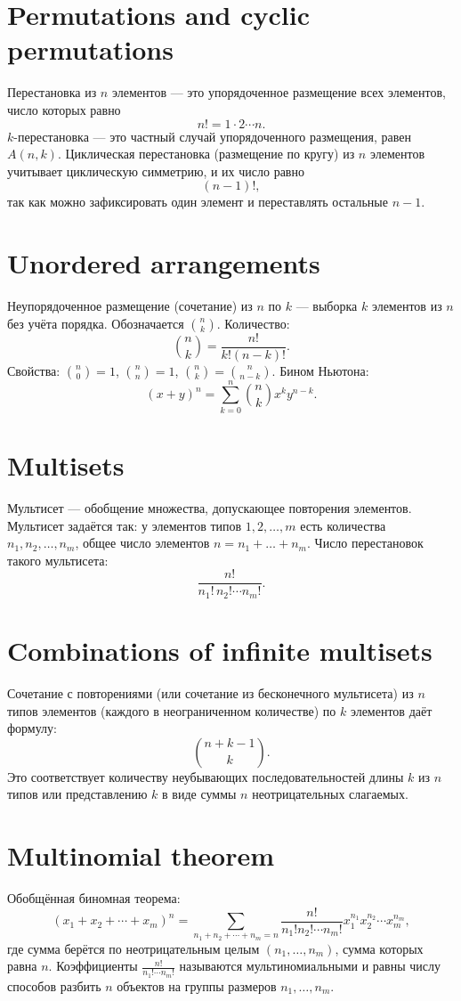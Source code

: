\documentclass{article}
\begin{document}
	\section{Permutations and cyclic permutations}
	Перестановка из $n$ элементов --- это упорядоченное размещение всех элементов, число которых равно
	\[
	n! = 1\cdot2\cdots n.
	\]
	$k$-перестановка --- это частный случай упорядоченного размещения, равен $A(n,k)$. Циклическая перестановка (размещение по кругу) из $n$ элементов учитывает циклическую симметрию, и их число равно
	\[
	(n-1)!,
	\]
	так как можно зафиксировать один элемент и переставлять остальные $n-1$.
	
	\section{Unordered arrangements}
	Неупорядоченное размещение (сочетание) из $n$ по $k$ --- выборка $k$ элементов из $n$ без учёта порядка. Обозначается $\displaystyle \binom{n}{k}$. Количество:
	\[
	\binom{n}{k} = \frac{n!}{k!(n-k)!}.
	\]
	Свойства: $\binom{n}{0}=1$, $\binom{n}{n}=1$, $\binom{n}{k} = \binom{n}{n-k}$. Бином Ньютона:
	\[
	(x+y)^n = \sum_{k=0}^n \binom{n}{k} x^k y^{n-k}.
	\]
	
	\section{Multisets}
	Мультисет --- обобщение множества, допускающее повторения элементов. Мультисет задаётся так: у элементов типов $1,2,\dots,m$ есть количества $n_1,n_2,\dots,n_m$, общее число элементов $n=n_1+\dots +n_m$. Число перестановок такого мультисета:
	\[
	\frac{n!}{n_1!\,n_2!\cdots n_m!}.
	\]
	
	\section{Combinations of infinite multisets}
	Сочетание с повторениями (или сочетание из бесконечного мультисета) из $n$ типов элементов (каждого в неограниченном количестве) по $k$ элементов даёт формулу:
	\[
	\binom{n+k-1}{k}.
	\]
	Это соответствует количеству неубывающих последовательностей длины $k$ из $n$ типов или представлению $k$ в виде суммы $n$ неотрицательных слагаемых.
	
	\section{Multinomial theorem}
	Обобщённая биномная теорема:
	\[
	(x_1 + x_2 + \cdots + x_m)^n = \sum_{n_1+n_2+\cdots+n_m=n} \frac{n!}{n_1!n_2!\cdots n_m!} x_1^{n_1}x_2^{n_2}\cdots x_m^{n_m},
	\]
	где сумма берётся по неотрицательным целым $(n_1,\dots,n_m)$, сумма которых равна $n$. Коэффициенты $\displaystyle \frac{n!}{n_1!\cdots n_m!}$ называются мультиномиальными и равны числу способов разбить $n$ объектов на группы размеров $n_1,\dots,n_m$.
	
\end{document}
